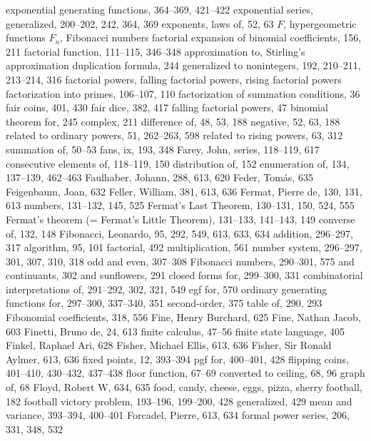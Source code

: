 exponential generating functions, 364--369, 421--422
exponential series, generalized, 200--202, 242, 364, 369
exponents, laws of, 52, 63
\medskip
$F$, \see hypergeometric functions
$F_n$, \see Fibonacci numbers
factorial expansion of binomial coefficients, 156, 211
factorial function, 111--115, 346--348
\sub approximation to, \see Stirling's approximation
\sub duplication formula, 244
\sub generalized to nonintegers, 192, 210--211, 213--214, 316
factorial powers, \see falling factorial powers, rising factorial powers
factorization into primes, 106--107, 110
factorization of summation conditions, 36
fair coins, 401, 430
fair dice, 382, 417
falling factorial powers, 47
\sub binomial theorem for, 245
\sub complex, 211
\sub difference of, 48, 53, 188
\sub negative, 52, 63, 188
\sub related to ordinary powers, 51, 262--263, 598
\sub related to rising powers, 63, 312
\sub summation of, 50--53
fans, ix, 193, 348
Farey, John, series, 118--119, 617
\sub consecutive elements of, 118--119, 150
\sub distribution of, 152
\sub enumeration of, 134, 137--139, 462--463
Faulhaber, Johann, 288, 613, 620
Feder, Tom\'as, 635
Feigenbaum, Joan, 632
Feller, William, 381, 613, 636
Fermat, Pierre de, 130, 131, 613
\sub numbers, 131--132, 145, 525
Fermat's Last Theorem, 130--131, 150, 524, 555
Fermat's theorem (= Fermat's Little Theorem), 131--133, 141--143, 149
\sub converse of, 132, 148
Fibonacci, Leonardo, 95, 292, 549, 613, 633, 634
\sub addition, 296--297, 317
\sub algorithm, 95, 101
\sub factorial, 492
\sub multiplication, 561
\sub number system, 296--297, 301, 307, 310, 318
\sub odd and even, 307--308
Fibonacci numbers, 290--301, 575
\sub and continuants, 302
\sub and sunflowers, 291
\sub closed forms for, 299--300, 331
\sub combinatorial interpretations of, 291--292, 302, 321, 549
\sub egf for, 570
\sub ordinary generating functions for, 297--300, 337--340, 351
\sub second-order, 375
\sub table of, 290, 293
Fibonomial coefficients, 318, 556
Fine, Henry Burchard, 625
Fine, Nathan Jacob, 603
Finetti, Bruno de, 24, 613
finite calculus, 47--56
finite state language, 405
Finkel, Raphael Ari, 628
Fisher, Michael Ellis, 613, 636
Fisher, Sir Ronald Aylmer, 613, 636
fixed points, 12, 393--394
\sub pgf for, 400--401, 428
flipping coins, 401--410, 430--432, 437--438
floor function, 67--69
\sub converted to ceiling, 68, 96
\sub graph of, 68
Floyd, Robert W, 634, 635
food, \see candy, cheese, eggs, pizza, sherry
football, 182
football victory problem, 193--196, 199--200, 428
\sub generalized, 429
\sub mean and variance, 393--394, 400--401
Forcadel, Pierre, 613, 634
formal power series, 206, 331, 348, 532
